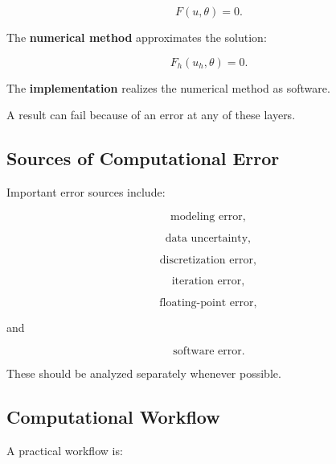 \[
\boxed{
F(u,\theta)=0.
}
\]

The \textbf{numerical method} approximates the solution:

\[
\boxed{
F_h(u_h,\theta)=0.
}
\]

The \textbf{implementation} realizes the numerical method as software.

A result can fail because of an error at any of these layers.

\subsection{Sources of Computational Error}
\label{subsec:scientific-computing-error-sources}

Important error sources include:

\[
\boxed{
\text{modeling error},
}
\]

\[
\boxed{
\text{data uncertainty},
}
\]

\[
\boxed{
\text{discretization error},
}
\]

\[
\boxed{
\text{iteration error},
}
\]

\[
\boxed{
\text{floating-point error},
}
\]

and

\[
\boxed{
\text{software error}.
}
\]

These should be analyzed separately whenever possible.

\subsection{Computational Workflow}
\label{subsec:scientific-computing-workflow}

A practical workflow is:

